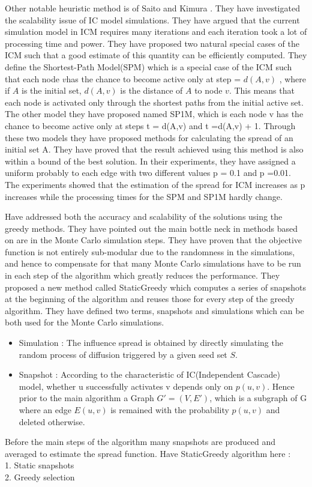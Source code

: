 \documentclass[english]{tktltiki}
\begin{document}
Other notable heuristic method is of Saito and Kimura \cite{kimura06}. They have investigated the scalability issue of IC model simulations. They have argued that the current simulation model in ICM requires many iterations and each iteration took a lot of processing time and power. They have proposed two natural special cases of the ICM such that a good estimate of this quantity can be efficiently computed. They define the Shortest-Path Model(SPM) which is a special case of the ICM such that each node $v$has the chance to become active only at step = $d(A,v)$ , where if $A$ is the initial set, $d(A,v)$ is the distance of $A$ to node $v$. This means that each node is activated only through the shortest paths from the initial active set. The other model they have proposed named SP1M, which is each node v has the chance to become active only at steps t = d(A,v) and t =d(A,v) + 1. Through these two models they have proposed methods for calculating the spread of an initial set A. They have proved that the result achieved using this method is also within a bound of the best solution. In their experiments, they have assigned a uniform probably to each edge with two different values p = 0.1 and p =0.01. The experiments showed that the estimation of the spread for ICM increases as p increases while the processing times for the SPM and SP1M hardly change. 

\cite{cheng13} Have addressed both the accuracy and scalability of the solutions using the greedy methods. They have pointed out the main bottle neck in methods based on \cite{kempe03} are in the Monte Carlo simulation steps. They have proven that the objective function is not entirely sub-modular due to the randomness in the simulations, and hence to compensate for that many Monte Carlo simulations have to be run in each step of the algorithm which greatly reduces the performance.
They proposed a new method called StaticGreedy which computes a series of snapshots at the beginning of the algorithm and reuses those for every step of the greedy algorithm.  They have defined two terms, snapshots and simulations which can be both used for the Monte Carlo simulations. \\
\begin{itemize}
\item 
Simulation : The influence spread is obtained by directly simulating the random process of diffusion triggered by a given seed set $S$.
\item
Snapshot : According to the characteristic of IC(Independent Cascade) model, whether u successfully activates v depends only on $p(u,v)$. Hence prior to the main algorithm a Graph $G'=(V,E')$, which is a subgraph of G where an edge $E(u,v)$ is remained with the probability $p(u,v)$ and deleted otherwise. 
\end{itemize}
Before the main steps of the algorithm many snapshots are produced and averaged to estimate the spread function. 
Have StaticGreedy algorithm here :\\
1. Static snapshots \\
2. Greedy selection \\
\end{document}
